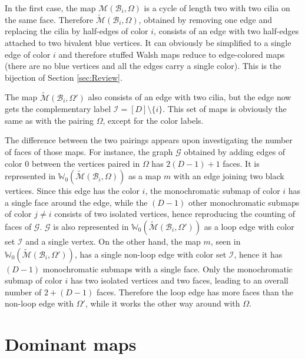 \documentclass[aps,prd,10pt,notitlepage,nofootinbib,superscriptaddress,showkeys,showpacs]{revtex4-1}
\begin{document}
In the first case, the map ${\mathcal{M}}({\mathcal{B}}_i, \Omega)$ is a cycle of length two with two cilia on the same face. Therefore $\tilde{\mathcal{M}}({\mathcal{B}}_i, \Omega)$, obtained by removing one edge and replacing the cilia by half-edges of color $i$, consists of an edge with two half-edges attached to two bivalent blue vertices. It can obviously be simplified to a single edge of color $i$ and therefore stuffed Walsh maps reduce to edge-colored maps (there are no blue vertices and all the edges carry a single color). This is the bijection of Section \ref{sec:Review}.

The map $\tilde{\mathcal{M}}({\mathcal{B}}_i, \Omega')$ also consists of an edge with two cilia, but the edge now gets the complementary label ${\mathcal{I}} = [D]\setminus \{i\}$. This set of maps is obviously the same as with the pairing $\Omega$, except for the color labels.

The difference between the two pairings appears upon investigating the number of faces of those maps. For instance, the graph ${\mathcal{G}}$ obtained by adding edges of color 0 between the vertices paired in $\Omega$ has $2(D-1) + 1$ faces. It is represented in ${\mathbb{W}}_0(\tilde{\mathcal{M}}({\mathcal{B}}_i, \Omega))$ as a map $m$ with an edge joining two black vertices. Since this edge has the color $i$, the monochromatic submap of color $i$ has a single face around the edge, while the $(D-1)$ other monochromatic submaps of color $j\neq i$ consists of two isolated vertices, hence reproducing the counting of faces of ${\mathcal{G}}$. ${\mathcal{G}}$ is also represented in ${\mathbb{W}}_0(\tilde{\mathcal{M}}({\mathcal{B}}_i, \Omega'))$ as a loop edge with color set ${\mathcal{I}}$ and a single vertex. On the other hand, the map $m$, seen in ${\mathbb{W}}_0(\tilde{\mathcal{M}}({\mathcal{B}}_i, \Omega'))$, has a single non-loop edge with color set ${\mathcal{I}}$, hence it has $(D-1)$ monochromatic submaps with a single face. Only the monochromatic submap of color $i$ has two isolated vertices and two faces, leading to an overall number of $2+(D-1)$ faces. Therefore the loop edge has more faces than the non-loop edge with $\Omega'$, while it works the other way around with $\Omega$.

\section{Dominant maps} \label{sec:DominantMaps}
\end{document}
